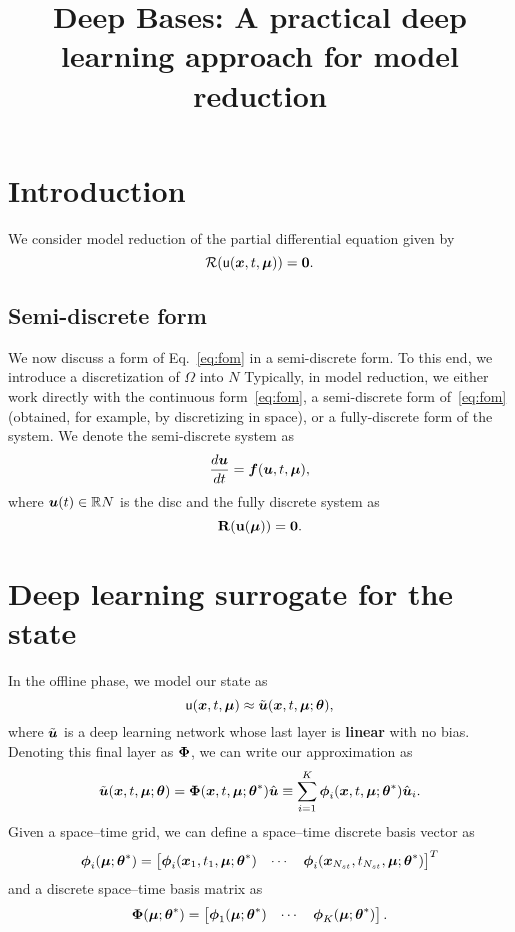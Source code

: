 \documentclass[3p,computermodern,10pt]{elsarticle}
\begin{document}
\begin{frontmatter}

\title{Deep Bases: A practical deep learning approach for model reduction}

\begin{abstract}
\end{abstract}
\end{frontmatter}


\section{Introduction}
We consider model reduction of the partial differential equation given by
\begin{equation}\label{eq:fom}
\mathcal{R}(\mathsf{u}(\boldsymbol x, t,\boldsymbol \mu)) = \boldsymbol 0.
\end{equation}
\subsection{Semi-discrete form}
We now discuss a form of Eq.~\eqref{eq:fom} in a semi-discrete form. To this end, we introduce a discretization of $\Omega$ into $N$ 
Typically, in model reduction, we either work directly with the continuous form~\eqref{eq:fom}, a semi-discrete form of~\eqref{eq:fom} (obtained, for example, by discretizing in space), or a fully-discrete form of the system. We denote the semi-discrete system as 
$$\frac{d \boldsymbol u}{dt} = \boldsymbol f(\boldsymbol u,t,\boldsymbol \mu),$$
where $\boldsymbol u(t) \in \mathbb{R}{N}$ is the disc
and the fully discrete system as
$$\mathbf{R}(\mathbf{u}(\boldsymbol \mu)) = \boldsymbol 0.$$ 

\section{Deep learning surrogate for the state}
In the offline phase, we model our state as
$$\mathsf{u}(\boldsymbol x, t,\boldsymbol \mu) \approx \tilde{\boldsymbol u}(\boldsymbol x, t,\boldsymbol \mu;\boldsymbol \theta),$$
where $\tilde{\boldsymbol u}$ is a deep learning network whose last layer is \textbf{linear} with no bias. Denoting this final layer as $\boldsymbol \Phi$, we can write our approximation as
$$\tilde{\boldsymbol u}(\boldsymbol x, t,\boldsymbol \mu;\boldsymbol \theta) = \boldsymbol \Phi (\boldsymbol x, t,\boldsymbol \mu;\boldsymbol \theta^*)\hat{\boldsymbol u} \equiv \sum_{i=1}^{K} \boldsymbol \phi_i(\boldsymbol x, t,\boldsymbol \mu;\boldsymbol \theta^*) \hat{\boldsymbol u}_i.$$
Given a space--time grid, we can define a space--time discrete basis vector as
$$\mathbf{\boldsymbol \phi}_i(\boldsymbol \mu;\boldsymbol \theta^*) = \begin{bmatrix} 
\boldsymbol \phi_i(\boldsymbol x_1,t_1,\boldsymbol \mu;\boldsymbol \theta^*) & \cdots & \boldsymbol \phi_i(\boldsymbol x_{N_{st}},t_{N_{st}},\boldsymbol \mu;\boldsymbol \theta^*)
\end{bmatrix}^T$$
and a discrete space--time basis matrix as
$$\mathbf{\Phi}(\boldsymbol \mu;\boldsymbol \theta^*) = \begin{bmatrix} \mathbf{\boldsymbol \phi}_1(\boldsymbol \mu;\boldsymbol \theta^*) & \cdots & \mathbf{\boldsymbol \phi}_{K}(\boldsymbol \mu;\boldsymbol \theta^*) \end{bmatrix}.$$
\end{document}
